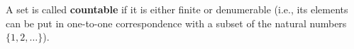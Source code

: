 A set is called \textbf{countable} if it is either finite or denumerable (i.e., its elements can be put in one-to-one correspondence with a subset of the natural numbers $\{1, 2, \ldots\}$).
